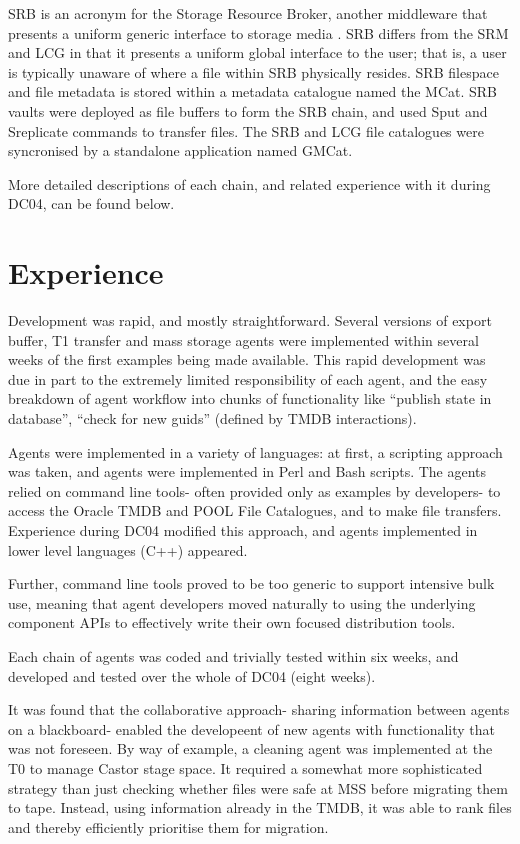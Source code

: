 \documentclass{cmspaper}
\begin{document}
SRB is an acronym for the Storage Resource Broker, another middleware
that presents a uniform generic interface to storage media
\cite{srb}. SRB differs from the SRM and LCG in that it presents a
uniform global interface to the user; that is, a user is typically
unaware of where a file within SRB physically resides. SRB filespace
and file metadata is stored within a metadata catalogue named the
MCat. SRB vaults were deployed as file buffers to form the SRB chain,
and used Sput and Sreplicate commands to transfer files. The SRB and
LCG file catalogues were syncronised by a standalone application named
GMCat.

More detailed descriptions of each chain, and related experience with
it during DC04, can be found below.

\section{Experience}
Development was rapid, and mostly straightforward. Several versions of export buffer, T1 transfer and mass storage agents were implemented within several weeks of the first examples being made available. This rapid development was due in part to the extremely limited responsibility of each agent, and the easy breakdown of agent workflow into chunks of functionality like ``publish state in database'', ``check for new guids'' (defined by TMDB interactions).

Agents were implemented in a variety of languages: at first, a scripting approach was taken, and agents were implemented in Perl and Bash scripts. The agents relied on command line tools- often provided only as examples by developers- to access the Oracle TMDB and POOL File Catalogues, and to make file transfers. Experience during DC04 modified this approach, and agents implemented in lower level languages (C++) appeared. 

Further, command line tools proved to be too generic to support intensive bulk use, meaning that agent developers moved naturally to using the underlying component APIs to effectively write their own focused distribution tools.

Each chain of agents was coded and trivially tested within six weeks, and developed and tested over the whole of DC04 (eight weeks). 

It was found that the collaborative approach- sharing information between agents on a blackboard- enabled the developeent of new agents with functionality that was not foreseen. By way of example, a cleaning agent was implemented at the T0 to manage Castor stage space. It required a somewhat more sophisticated strategy than just checking whether files were safe at MSS before migrating them to tape. Instead, using information already in the TMDB, it was able to rank files and thereby efficiently prioritise them for migration.
\end{document}
